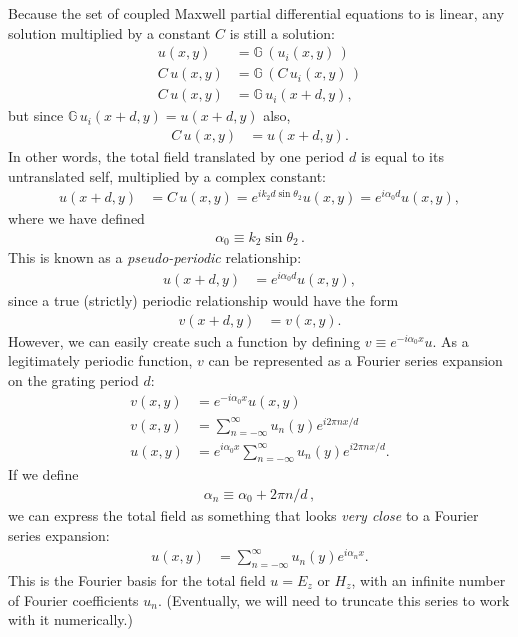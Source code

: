 Because the set of coupled Maxwell partial differential equations  to  is linear, any solution multiplied by a constant $C$ is still a solution:
\begin{align}
u(x,y) &= \mathbb{G} \, ( u_i(x,y) \, ) \\
C \, u(x,y) &= \mathbb{G} \, ( C \, u_i(x,y) \, ) \\
C \, u(x, y) &= \mathbb{G} \, u_i(x+d,y),
\end{align}
but since $\mathbb{G} \, u_i(x+d,y) = u(x+d, y)$ also,
\begin{align}
C \, u(x, y) &= u(x+d, y).
\end{align}
In other words, the total field translated by one period $d$ is equal to its untranslated self, multiplied by a complex constant:
\begin{align}
u(x+d, y) &= C \, u(x, y) = e^{i k_2 d \sin \theta_2} u(x,y) = e^{i \alpha_0 d} u(x,y),
\end{align}
where we have defined 
\begin{align}
\boxed{\alpha_0 \equiv k_2 \sin \theta_2} \,.
\end{align}
This is known as a \emph{pseudo-periodic} relationship:
\begin{align}
u(x+d, y) &= e^{i \alpha_0 d} u(x,y),
\end{align}
since a true (strictly) periodic relationship would have the form
\begin{align}
v(x+d, y) &= v(x,y).
\end{align}
However, we can easily create such a function by defining $v \equiv e^{-i \alpha_0 x} u$.  As a legitimately periodic function, $v$ can be represented as a Fourier series expansion on the grating period $d$:
\begin{align}
v(x, y) &= e^{-i \alpha_0 x} u(x,y) \\
v(x,y) &= \sum_{n=-\infty}^{\infty} u_n(y) e^{i2\pi n x/d} \\
u(x,y) &= e^{i \alpha_0 x} \sum_{n=-\infty}^{\infty} u_n(y) e^{i2\pi n x/d}.
\end{align}
If we define 
\begin{align}
\boxed{\alpha_n \equiv \alpha_0 + 2 \pi n / d} \, ,
\end{align}
we can express the total field as something that looks \emph{very close} to a Fourier series expansion:
\begin{align}
\label{eqnFourierExpansionU}
u(x,y) &=  \sum_{n=-\infty}^{\infty} u_n(y) e^{i\alpha_nx}.
\end{align}
This is the Fourier basis for the total field $u = E_z$ or $H_z$, with an infinite number of Fourier coefficients $u_n$.  (Eventually, we will need to truncate this series to work with it numerically.)
